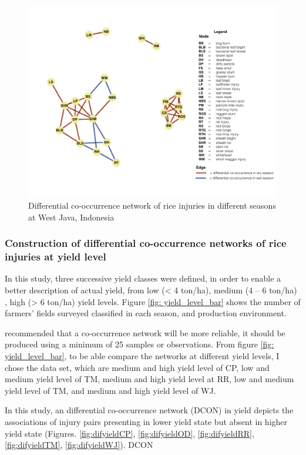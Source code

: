 \begin{figure}
\centering
\includegraphics[width = 1\textwidth]{figures/difseasonWJ.pdf}
\caption{Differential co-occurrence network of rice injuries in different seasons at West Java, Indonesia}
\label{fig:difseasonWJ}
\end{figure}

\subsubsection{Construction of differential co-occurrence networks of rice injuries at yield level}

In this study, three successive yield classes were defined, in order to enable a better description of actual yield, from low (< 4 ton/ha), medium (4 – 6 ton/ha) ,  high (> 6 ton/ha) yield levels. Figure \ref{fig: yield_level_bar} shows the number of farmers’ fields surveyed classified in each season, and production environment.

\citet{Berry_2014_Deciphering} recommended that a co-occurrence network will be more reliable, it should be produced using a minimum of 25 samples or observations. From figure \ref{fig: yield_level_bar}, to be able compare the networks at different yield levels, I chose the data set, which are medium and high yield level of CP, low and medium yield level of TM, medium and high yield level at RR, low and medium yield level of TM, and medium and high yield level of WJ. 

In this study, an differential co-occurrence network (DCON) in yield depicts the associations of injury pairs presenting in lower yield state but absent in higher yield state (Figures. \ref{fig:difyieldCP}, \ref{fig:difyieldOD}, \ref{fig:difyieldRR}, \ref{fig:difyieldTM}, \ref{fig:difyieldWJ}).  DCON

